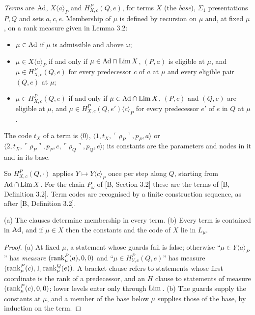 \documentclass[11pt]{article}
\begin{document}
\begin{statement} \emph{Terms} are $\mathrm{Ad}$, $X\langle a\rangle_P$ and $H^P_{X,c}(Q,e)$, for
terms $X$ (the \emph{base}), $\Sigma_1$ presentations $P, Q$ and sets $a, c, e$. Membership of $\mu$ is defined by
recursion on $\mu$ and, at fixed $\mu$, on a rank measure given in Lemma 3.2:
\begin{itemize}
\item $\mu \in \mathrm{Ad}$ if $\mu$ is admissible and above $\omega$;
\item $\mu \in X\langle a\rangle_P$ if and only if $\mu \in \mathrm{Ad} \cap \mathrm{Lim}\, X$, $(P,a)$ is eligible at $\mu$, and $\mu
  \in H^P_{X,c}(Q,e)$ for every predecessor $c$ of $a$ at $\mu$ and every eligible pair $(Q,e)$ at $\mu$;
\item $\mu \in H^P_{X,c}(Q,e)$ if and only if $\mu \in \mathrm{Ad} \cap \mathrm{Lim}\, X$, $(P,c)$ and $(Q,e)$ are eligible at $\mu$,
  and $\mu \in H^P_{X,c}(Q,e')\langle c\rangle_P$ for every predecessor $e'$ of $e$ in $Q$ at $\mu$.
\end{itemize}
The code $t_X$ of a term is $\langle 0\rangle$, $\langle 1, t_X, \ulcorner\rho_P\urcorner, p_P, a\rangle$ or $\langle 2,
t_X, \ulcorner\rho_P\urcorner, p_P, c, \ulcorner\rho_Q\urcorner, p_Q, e\rangle$; its constants are the parameters and
nodes in it and in its base.
\end{statement}

So $H^P_{X,c}(Q,\cdot)$ applies $Y \mapsto Y\langle c\rangle_P$ once per step along $Q$, starting from $\mathrm{Ad} \cap \mathrm{Lim}\, X$.
For the chain $P_\omega$ of [B, Section 3.2] these are the terms of [B, Definition 3.2]. Term codes are recognised by a
finite construction sequence, as after [B, Definition 3.2].

\begin{statement} (a) The clauses determine membership in every term. (b) Every term is contained in
$\mathrm{Ad}$, and if $\mu \in X$ then the constants and the code of $X$ lie in $L_\mu$.
\end{statement}

\begin{proof}
(a) At fixed $\mu$, a statement whose guards fail is false; otherwise ``$\mu \in Y\langle a\rangle_P$'' has
\emph{measure} $(\mathrm{rank}^P_\mu(a), 0, 0)$ and ``$\mu \in H^P_{Y,c}(Q,e)$'' has measure $(\mathrm{rank}^P_\mu(c), 1,
\mathrm{rank}^Q_\mu(e))$. A bracket clause refers to statements whose first coordinate is the rank of a predecessor, and an $H$
clause to statements of measure $(\mathrm{rank}^P_\mu(c),0,0)$; lower levels enter only through $\mathrm{Lim}\,$. (b) The guards supply the
constants at $\mu$, and a member of the base below $\mu$ supplies those of the base, by induction on the term.
\end{proof}
\end{document}
